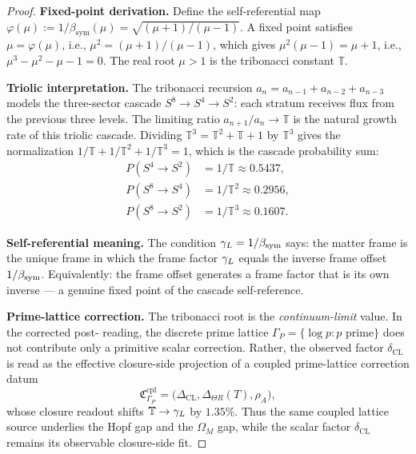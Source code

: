 \begin{proof}
\textbf{Fixed-point derivation.}
Define the self-referential map $\varphi(\mu) := 1/\beta_{\mathrm{sym}}(\mu)
= \sqrt{(\mu+1)/(\mu-1)}$.
A fixed point satisfies $\mu = \varphi(\mu)$, i.e.,
$\mu^2 = (\mu+1)/(\mu-1)$, which gives $\mu^2(\mu-1) = \mu+1$, i.e.,
$\mu^3 - \mu^2 - \mu - 1 = 0$.
The real root $\mu > 1$ is the tribonacci constant $\mathbb{T}$.

\textbf{Triolic interpretation.}
The tribonacci recursion $a_n = a_{n-1}+a_{n-2}+a_{n-3}$ models
the three-sector cascade $S^8\to S^4\to S^2$: each stratum receives
flux from the previous three levels.
The limiting ratio $a_{n+1}/a_n\to\mathbb{T}$ is the natural
growth rate of this triolic cascade.
Dividing $\mathbb{T}^3 = \mathbb{T}^2+\mathbb{T}+1$ by $\mathbb{T}^3$
gives the normalization
$1/\mathbb{T}+1/\mathbb{T}^2+1/\mathbb{T}^3 = 1$,
which is the cascade probability sum:
\begin{align*}
P(S^4\to S^2)  &= 1/\mathbb{T} \approx 0.5437, \\
P(S^8\to S^4)  &= 1/\mathbb{T}^2 \approx 0.2956, \\
P(S^8\to S^2)  &= 1/\mathbb{T}^3 \approx 0.1607.
\end{align*}

\textbf{Self-referential meaning.}
The condition $\gamma_L = 1/\beta_{\mathrm{sym}}$ says: the matter frame is the unique frame
in which the frame factor $\gamma_L$ equals the inverse frame offset $1/\beta_{\mathrm{sym}}$.
Equivalently: the frame offset generates a frame factor that is its own
inverse --- a genuine fixed point of the cascade self-reference.

\textbf{Prime-lattice correction.}
The tribonacci root is the \emph{continuum-limit} value.
In the corrected post- reading, the discrete prime lattice
$\Gamma_P = \{\log p : p\text{ prime}\}$ does not contribute only a
primitive scalar correction. Rather, the observed factor
$\delta_{\mathrm{CL}}$ is read as the effective closure-side projection
of a coupled prime-lattice correction datum
\[
 \mathfrak{C}_{\Gamma_P}^{\mathrm{cpl}}
 =
 \bigl(
 \Delta_{\mathrm{CL}},
 \Delta_{\Theta R}(T),
 \rho_A
 \bigr),
\]
whose closure readout shifts $\mathbb{T}\to\gamma_L$ by $1.35\%$.
Thus the same coupled lattice source underlies the Hopf gap and the
$\Omega_M$ gap, while the scalar factor $\delta_{\mathrm{CL}}$ remains
its observable closure-side fit.


\end{proof}
